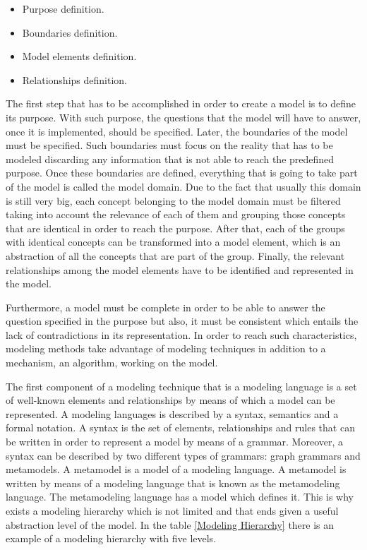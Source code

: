 \begin{itemize}

\item Purpose definition.
\item Boundaries definition.
\item Model elements definition.
\item Relationships definition.

\end{itemize}

The first step that has to be accomplished in order to create a model is to define its purpose. With such purpose, the questions that the model will have to answer, once it is implemented, should be specified. Later, the boundaries of the model must be specified. Such boundaries must focus on the reality that has to be modeled discarding any information that is not able to reach the predefined purpose. Once these boundaries are defined, everything that is going to take part of the model is called the model domain. Due to the fact that usually this domain is still very big, each concept belonging to the model domain must be filtered taking into account the relevance of each of them and grouping those concepts that are identical in order to reach the purpose. After that, each of the groups with identical concepts can be transformed into a model element, which is an abstraction of all the concepts that are part of the group. Finally, the relevant relationships among the model elements have to be identified and represented in the model.

Furthermore, a model must be complete in order to be able to answer the question specified in the purpose but also, it must be consistent which entails the lack of contradictions in its representation. In order to reach such characteristics, modeling methods take advantage of modeling techniques in addition to a mechanism, an algorithm, working on the model.

The first component of a modeling technique that is a modeling language is a set of well-known elements and relationships by means of which a model can be represented. A modeling languages is described by a syntax, semantics and a formal notation. A syntax is the set of elements, relationships and rules that can be written in order to represent a model by means of a grammar. Moreover, a syntax can be described by two different types of grammars: graph grammars and metamodels. A metamodel is a model of a modeling language. A metamodel is written by means of a modeling language that is known as the metamodeling language. The metamodeling language has a model which defines it. This is why exists a modeling hierarchy which is not limited and that ends given a useful abstraction level of the model. In the table \ref{Modeling Hierarchy} there is an example of a modeling hierarchy with five levels.

